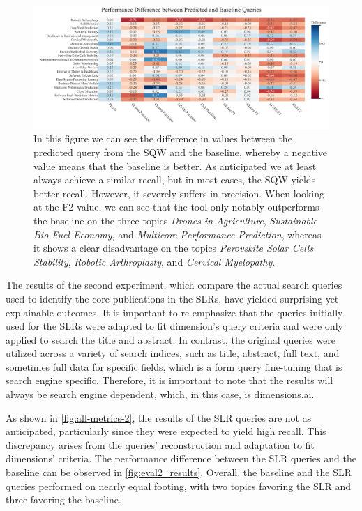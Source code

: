 \begin{figure}
	\hspace*{-.8cm}	
	\includegraphics[scale=0.45]{pics/eval1_results.pdf}
	\caption{In this figure we can see the difference in values between the predicted query from the SQW and the baseline, whereby a negative value means that the baseline is better. As anticipated we at least always achieve a similar recall, but in most cases, the SQW yields better recall. However, it severely suffers in precision. When looking at the F2 value, we can see that the tool only notably outperforms the baseline on the three topics \textit{Drones in Agriculture}, \textit{Sustainable Bio Fuel Economy}, and \textit{Multicore Performance Prediction}, whereas it shows a clear disadvantage on the topics \textit{Perovskite Solar Cells Stability}, \textit{Robotic Arthroplasty}, and \textit{Cervical Myelopathy}.}
	\label{fig:eval1_results}
\end{figure}

The results of the second experiment, which compare the actual search queries used to identify the core publications in the SLRs, have yielded surprising yet explainable outcomes. It is important to re-emphasize that the queries initially used for the SLRs were adapted to fit dimension's query criteria and were only applied to search the title and abstract. In contrast, the original queries were utilized across a variety of search indices, such as title, abstract, full text, and sometimes full data for specific fields, which is a form query fine-tuning that is search engine specific. Therefore, it is important to note that the results will always be search engine dependent, which, in this case, is dimensions.ai.

As shown in \autoref{fig:all-metrics-2}, the results of the SLR queries are not as anticipated, particularly since they were expected to yield high recall. This discrepancy arises from the queries' reconstruction and adaptation to fit dimensions' criteria. The performance difference between the SLR queries and the baseline can be observed in \autoref{fig:eval2_results}. Overall, the baseline and the SLR queries performed on nearly equal footing, with two topics favoring the SLR and three favoring the baseline. 

